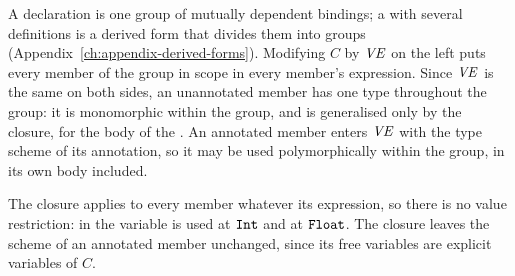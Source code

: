 

\begin{rulecomments}
 A declaration is one group of mutually dependent
bindings; a  with several definitions is a derived form that divides
them into groups (Appendix~\ref{ch:appendix-derived-forms}). Modifying $C$ by
$\mathit{VE}$ on the left puts every member of the group in scope in every member's
expression. Since $\mathit{VE}$ is the same on both sides, an unannotated member has one
type throughout the group: it is monomorphic within the group, and is
generalised only by the closure, for the body of the . %
An annotated member enters $\mathit{VE}$ with the type scheme of its annotation, so it
may be used polymorphically within the group, in its own body included.

The closure applies to every member whatever its expression, so there is no
value restriction: in  the variable
 is used at $\mathtt{Int}$ and at $\mathtt{Float}$. The closure leaves the scheme of an
annotated member unchanged, since its free variables are explicit variables of
$C$.
\end{rulecomments}




